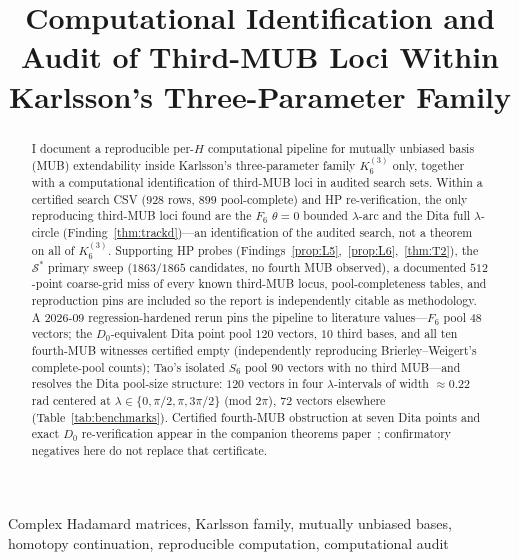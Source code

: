 \documentclass[onecolumn]{IEEEtran}
\begin{document}
\title{Computational Identification and Audit of Third-MUB Loci Within Karlsson's Three-Parameter Family}

\author{%
%
}

\maketitle

\begin{abstract}
I document a reproducible per-$H$ computational pipeline for mutually unbiased basis (MUB) extendability inside Karlsson's three-parameter family $K_6^{(3)}$ only, together with a computational identification of third-MUB loci in audited search sets.
Within a certified search CSV ($928$ rows, $899$ pool-complete) and HP re-verification, the only reproducing third-MUB loci found are the $F_6$ $\theta{=}0$ bounded $\lambda$-arc and the Dita full $\lambda$-circle (Finding~\ref{thm:trackd})---an identification of the audited search, not a theorem on all of $K_6^{(3)}$.
Supporting HP probes (Findings~\ref{prop:L5},~\ref{prop:L6},~\ref{thm:T2}), the $\mathcal{S}^*$ primary sweep ($1863/1865$ candidates, no fourth MUB observed), a documented $512$-point coarse-grid miss of every known third-MUB locus, pool-completeness tables, and reproduction pins are included so the report is independently citable as methodology.
A 2026-09 regression-hardened rerun pins the pipeline to literature values---$F_6$ pool $48$ vectors; the $D_0$-equivalent Dita point pool $120$ vectors, $10$ third bases, and all ten fourth-MUB witnesses certified empty (independently reproducing Brierley--Weigert's complete-pool counts); Tao's isolated $S_6$ pool $90$ vectors with no third MUB---and resolves the Dita pool-size structure: $120$ vectors in four $\lambda$-intervals of width ${\approx}0.22$ rad centered at $\lambda\in\{0,\pi/2,\pi,3\pi/2\}$ (mod $2\pi$), $72$ vectors elsewhere (Table~\ref{tab:benchmarks}).
Certified fourth-MUB obstruction at seven Dita points and exact $D_0$ re-verification appear in the companion theorems paper~\cite{JaupiTheorems2026}; confirmatory negatives here do not replace that certificate.
\end{abstract}

\begin{IEEEkeywords}
Complex Hadamard matrices, Karlsson family, mutually unbiased bases, homotopy continuation, reproducible computation, computational audit
\end{IEEEkeywords}
\end{document}
